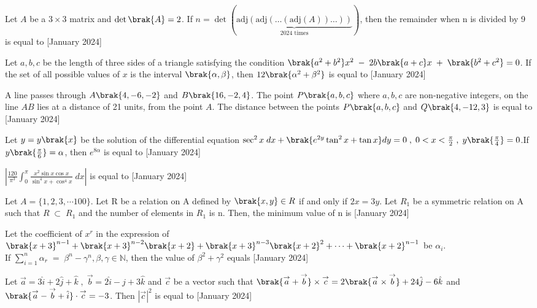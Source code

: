 \iffalse
\title{2024}
\author{EE24BTECH11063}
\section{integer}
\fi
\item Let $A$ be a $3 \times 3$ matrix and $\det\brak{A}=2$. If $n = \det(\underbrace{\text{adj}(\text{adj}(\dots(\text{adj}(A))\dots))}_{2024 \text{ times}})$, then the remainder when n is divided by 9 is equal to \hfill{[January 2024]}
    \bigskip
    \item Let $a,b,c$ be the length of three sides of a triangle satisfying the condition $\brak{a^2+b^2}x^2\;-\;2b\brak{a+c}x\;+\;\brak{b^2+c^2}=0$. If the set of all possible values of $x$ is the interval $\brak{\alpha,\beta}$, then $12\brak{{\alpha}^2+{\beta}^2}$ is equal to \hfill{[January 2024]}
\bigskip
    \item A line passes through $A\brak{4,-6,-2}$ and $B\brak{16,-2,4}$. The point $P\brak{a,b,c}$ where $a,b,c$ are non-negative integers, on the line $AB$ lies at a distance of 21 units, from the point $A$. The distance between the points $P\brak{a,b,c}$ and $Q\brak{4,-12,3}$ is equal to \hfill{[January 2024]}
    \bigskip
    \item Let $y=y\brak{x}$ be the solution of the differential equation $\sec^2{x}\;dx+\brak{e^{2y}\tan^2{x}+\tan{x}}dy=0\;,\;0<x<\frac{\pi}{2}\;,\;y\brak{\frac{\pi}{4}}=0$.If $y\brak{\frac{\pi}{6}}=\alpha$, then $e^{8\alpha}$ is equal to \hfill{[January 2024]}
    \bigskip
    \item $\left|\frac{120}{{\pi}^3}\int_{0}^{\pi} \frac{x^2\sin{x}\cos{x}}{\sin^{4}{x}+\cos^{4}{x}}\;dx\right|$ is equal to \hfill{[January 2024]}
    \bigskip
    \item Let $A=\{1,2,3,\cdots100\}$. Let R be a relation on A defined by $\brak{x,y}\in R$ if and only if $2x=3y$. Let $R_1$ be a symmetric relation on A such that $R\;\subset\;R_1$ and the number of elements in $R_1$ is n. Then, the minimum value of n is \hfill{[January 2024]}
    \bigskip
    \item Let the coefficient of $x^r$ in the expression of\\
    $\brak{x+3}^{n-1}+\brak{x+3}^{n-2}\brak{x+2}+\brak{x+3}^{n-3}\brak{x+2}^2+\cdots +\brak{x+2}^{n-1}$ be $\alpha_i$.\\
    If $\sum_{i=1}^{n} \alpha_r\;=\;{\beta}^n-{\gamma}^n,\beta,\gamma\in \mathbb{N}$, then the value of ${\beta}^2+{\gamma}^2$ equals \hfill{[January 2024]}
    \bigskip
    \item Let $\overset{\rightarrow}{a}=3\hat{i}+2\hat{j}+\hat{k}\;,\;\overset{\rightarrow}{b}=2\hat{i}-\hat{j}+3\hat{k}$ and $\overset{\rightarrow}{c}$ be a vector such that $\brak{\overset{\rightarrow}{a}+\overset{\rightarrow}{b}}\times \overset{\rightarrow}{c}=2\brak{\overset{\rightarrow}{a} \times \overset{\rightarrow}{b}}+24\hat{j}-6\hat{k}$ and $\brak{\overset{\rightarrow}{a}-\overset{\rightarrow}{b}+\hat{i}}\cdot \overset{\rightarrow}{c}=-3$. Then $|\overset{\rightarrow}{c}|^2$ is equal to \hfill{[January 2024]}
